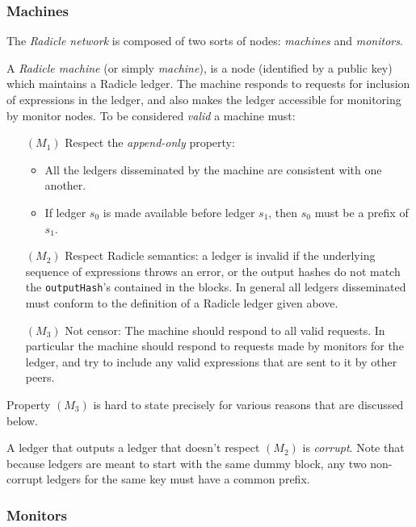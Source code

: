 \documentclass[a4paper, oneside, 10pt]{amsart}
\begin{document}
\subsubsection{Machines}

The \emph{Radicle network} is composed of two sorts of nodes: \emph{machines}
and \emph{monitors}.

A \emph{Radicle machine} (or simply \emph{machine}), is a node (identified by a
public key) which maintains a Radicle ledger. The machine responds to requests
for inclusion of expressions in the ledger, and also makes the ledger accessible
for monitoring by monitor nodes. To be considered \emph{valid} a machine must:
\begin{itemize}
\item[$(M_1)$]
  Respect the \emph{append-only} property:
  \begin{itemize}
  \item
    All the ledgers disseminated by the machine are consistent with one another.
  \item
    If ledger $s_0$ is made available before ledger $s_1$, then $s_0$ must be a
    prefix of $s_1$.
  \end{itemize}
\item[$(M_2)$] Respect Radicle semantics: a ledger is invalid if the underlying
  sequence of expressions throws an error, or the output hashes do not match the
  \texttt{outputHash}'s contained in the blocks. In general all ledgers
  disseminated must conform to the definition of a Radicle ledger given above.
\item[$(M_3)$] Not censor: The machine should respond to all valid requests. In
  particular the machine should respond to requests made by monitors for the
  ledger, and try to include any valid expressions that are sent to it by other
  peers.
\end{itemize}

Property $(M_3)$ is hard to state precisely for various reasons that are
discussed below.

A ledger that outputs a ledger that doesn't respect $(M_2)$ is
\emph{corrupt}. Note that because ledgers are meant to start with the same dummy
block, any two non-corrupt ledgers for the same key must have a common prefix.

\subsubsection{Monitors}\label{monitors}
\end{document}
